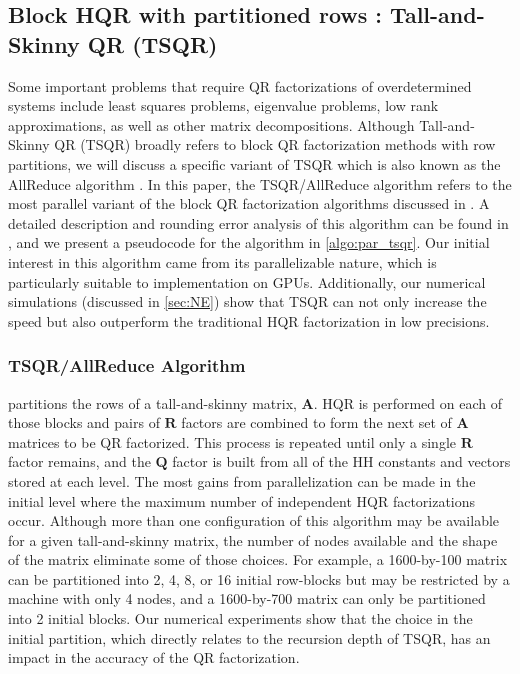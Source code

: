 \documentclass[review,onefignum,onetabnum]{siamart190516}
\newcommand{\bb}[1]{\mathbf{#1}}
\begin{document}
\subsection{Block HQR with partitioned rows : Tall-and-Skinny QR (TSQR)}\label{sec:TSQR}
Some important problems that require QR factorizations of overdetermined systems include least squares problems, eigenvalue problems, low rank approximations, as well as other matrix decompositions.
Although Tall-and-Skinny QR (TSQR) broadly refers to block QR factorization methods with row partitions, we will discuss a specific variant of TSQR which is also known as the AllReduce algorithm \cite{Mori2012}.
In this paper, the TSQR/AllReduce algorithm refers to the most parallel variant of the block QR factorization algorithms discussed in \cite{Demmel2012}.
A detailed description and rounding error analysis of this algorithm can be found in \cite{Mori2012}, and we present a pseudocode for the algorithm in \cref{algo:par_tsqr}.
Our initial interest in this algorithm came from its parallelizable nature, which is particularly suitable to implementation on GPUs. 
Additionally, our numerical simulations (discussed in \cref{sec:NE}) show that TSQR can not only increase the speed but also outperform the traditional HQR factorization in low precisions.
\subsubsection{TSQR/AllReduce Algorithm}
 partitions the rows of a tall-and-skinny matrix, $\bb{A}$. 
HQR is performed on each of those blocks and pairs of $\bb{R}$ factors are combined to form the next set of $\bb{A}$ matrices to be QR factorized. 
This process is repeated until only a single $\bb{R}$ factor remains, and the $\bb{Q}$ factor is built from all of the HH constants and vectors stored at each level.
The most gains from parallelization can be made in the initial level where the maximum number of independent HQR factorizations occur. 
Although more than one configuration of this algorithm may be available for a given tall-and-skinny matrix, the number of nodes available and the shape of the matrix eliminate some of those choices. 
For example, a 1600-by-100 matrix can be partitioned into 2, 4, 8, or 16 initial row-blocks but may be restricted by a machine with only 4 nodes, and a 1600-by-700 matrix can only be partitioned into 2 initial blocks.
Our numerical experiments show that the choice in the initial partition, which directly relates to the recursion depth of TSQR, has an impact in the accuracy of the QR factorization. \par
\end{document}
